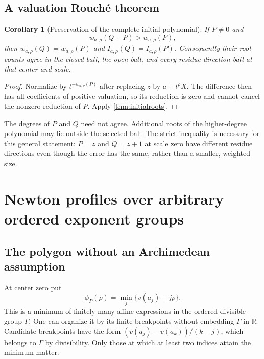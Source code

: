 \documentclass[11pt,letterpaper]{article}
\numberwithin{equation}{section}
\newtheorem{corollary}[theorem]{Corollary}
\theoremstyle{definition}
\theoremstyle{remark}\newtheorem{remark}[theorem]{Remark}
\newcommand{\R}{\mathbb R}
\begin{document}
\subsection{A valuation Rouch\'e theorem}
\begin{corollary}[Preservation of the complete initial polynomial]
\label{cor:valrouche}
If $P\ne0$ and
\begin{equation}\label{eq:valrouche}
 w_{a,\rho}(Q-P)>w_{a,\rho}(P),
\end{equation}
then $w_{a,\rho}(Q)=w_{a,\rho}(P)$ and
$I_{a,\rho}(Q)=I_{a,\rho}(P)$. Consequently their root counts agree
in the closed ball, the open ball, and every residue-direction ball at
that center and scale.
\end{corollary}
\begin{proof}
Normalize by $t^{-w_{a,\rho}(P)}$ after replacing $z$ by $a+t^\rho X$.
The difference then has all coefficients of positive valuation, so
its reduction is zero and cannot cancel the nonzero reduction of $P$.
Apply \cref{thm:initialroots}.
\end{proof}
The degrees of $P$ and $Q$ need not agree. Additional roots of the
higher-degree polynomial may lie outside the selected ball. The strict
inequality is necessary for this general statement: $P=z$ and
$Q=z+1$ at scale zero have different residue directions even though the
error has the same, rather than a smaller, weighted size.

\section{Newton profiles over arbitrary ordered exponent groups}\label{sec:newton}

\subsection{The polygon without an Archimedean assumption}
At center zero put
\[
 \phi_P(\rho)=\min_j\{v(a_j)+j\rho\}.
\]
This is a minimum of finitely many affine expressions in the ordered
divisible group $\Gamma$. One can organize it by its finite breakpoints
without embedding $\Gamma$ in $\R$. Candidate breakpoints have the form
$(v(a_j)-v(a_k))/(k-j)$, which belongs to $\Gamma$ by divisibility.
Only those at which at least two indices attain the minimum matter.
\end{document}
